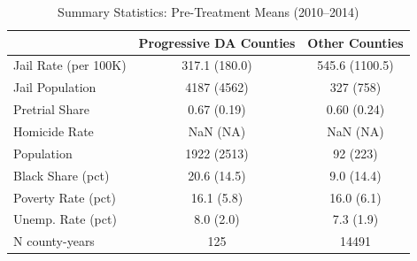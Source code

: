 \begin{table}[ht]
\centering
\begin{tabular}{lcc}
  \toprule
 & Progressive DA Counties & Other Counties \\ 
  \midrule
Jail Rate (per 100K) & 317.1 (180.0) & 545.6 (1100.5) \\ 
  Jail Population & 4187 (4562) & 327 (758) \\ 
  Pretrial Share & 0.67 (0.19) & 0.60 (0.24) \\ 
  Homicide Rate & NaN (NA) & NaN (NA) \\ 
  Population & 1922 (2513) & 92 (223) \\ 
  Black Share (pct) & 20.6 (14.5) & 9.0 (14.4) \\ 
  Poverty Rate (pct) & 16.1 (5.8) & 16.0 (6.1) \\ 
  Unemp. Rate (pct) & 8.0 (2.0) & 7.3 (1.9) \\ 
  N county-years &   125 & 14491 \\ 
   \bottomrule
\end{tabular}
\caption{Summary Statistics: Pre-Treatment Means (2010--2014)} 
\label{tab:summary}
\end{table}
